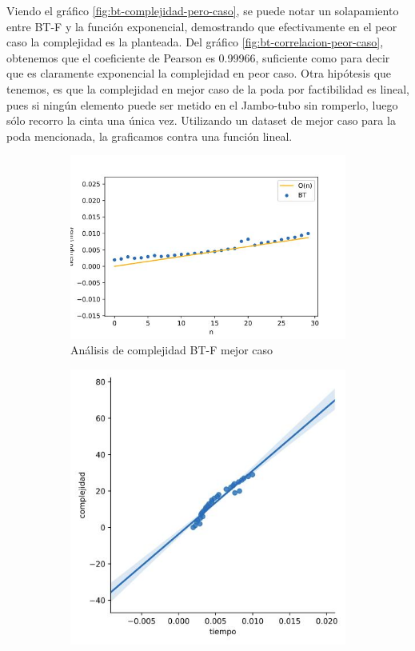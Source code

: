 \documentclass[10pt,a4paper]{article}
\begin{document}
\newline
Viendo el gráfico \ref{fig:bt-complejidad-pero-caso}, se puede notar un solapamiento entre BT-F y la función exponencial, demostrando que efectivamente en el peor caso la complejidad es la planteada.
Del gráfico \ref{fig:bt-correlacion-peor-caso}, obtenemos que el coeficiente de Pearson es 0.99966, suficiente como para decir que es claramente exponencial la complejidad en peor caso.
Otra hipótesis que tenemos, es que la complejidad en mejor caso de la poda por factibilidad es lineal, pues si ningún elemento puede ser metido en el Jambo-tubo sin romperlo, luego sólo recorro la cinta una única vez. Utilizando un dataset de mejor caso para la poda mencionada, la graficamos contra una función lineal.
\newline
\begin{figure}[h!]
\begin{subfigure}{0.4\linewidth}
	\centering
		\includegraphics[scale=0.30]{img/bt-complejidad-mejor-caso.jpg}
		\caption{Análisis de complejidad BT-F mejor caso}
		\label{fig:bt-complejidad-mejor-caso}
\end{subfigure}
\begin{subfigure}{0.4\linewidth}
	\centering
		\includegraphics[scale=0.30]{img/bt-correlacion-mejor-caso.jpg}

\end{subfigure}
\end{figure}
\end{document}
